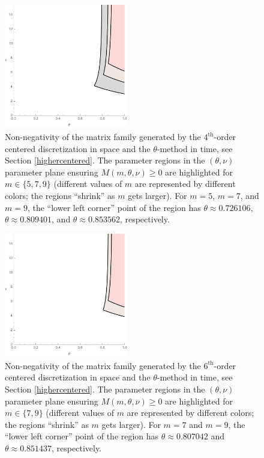 \documentclass[a4paper]{article}
\newcommand{\te}{\theta}
\begin{document}
\begin{figure}
\begin{center}
\includegraphics[width=0.48\textwidth]{fig_5stencilm579.pdf}
\caption{Non-negativity of the matrix family generated by the $4^\text{th}$-order centered discretization in space and the $\theta$-method in time, see Section \ref{highercentered}. The parameter regions in the $(\te,\nu)$ parameter plane ensuring $M(m,\te,\nu)\ge 0$ are highlighted for $m\in\{5, 7, 9\}$ (different values of $m$ are represented by different colors; the regions ``shrink'' as $m$ gets larger). For $m=5$, $m=7$, and $m=9$, the ``lower left corner'' point of the region has $\theta\approx 0.726106$, $\theta\approx 0.809401$, and $\theta\approx 0.853562$, respectively.}\label{fig_5stencilm579}
\end{center}
\end{figure}

\begin{figure}
\begin{center}
\includegraphics[width=0.48\textwidth]{fig_7stencilm79.pdf}
\caption{Non-negativity of the matrix family generated by the $6^\text{th}$-order centered discretization in space and the $\theta$-method in time, see Section \ref{highercentered}. The parameter regions in the $(\te,\nu)$ parameter plane ensuring $M(m,\te,\nu)\ge 0$ are highlighted for $m\in\{7, 9\}$ (different values of $m$ are represented by different colors; the regions ``shrink'' as $m$ gets larger). For $m=7$ and $m=9$, the ``lower left corner'' point of the region has $\theta\approx 0.807042$ and $\theta\approx 0.851437$, respectively.}\label{fig_7stencilm79}
\end{center}
\end{figure}
\end{document}
